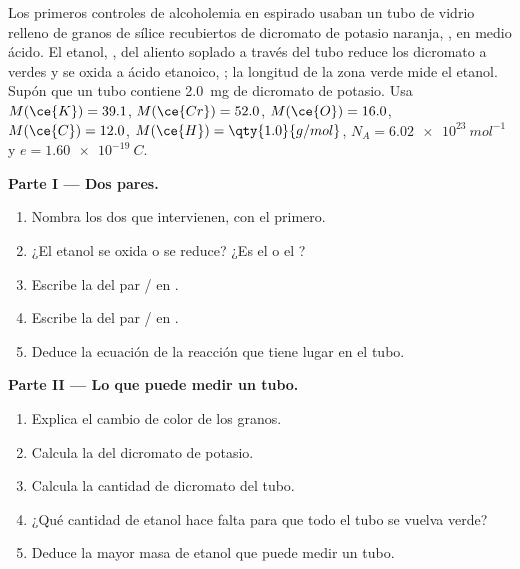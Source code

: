 \begin{problem}
\label{pb:g11:redox:1}
Los primeros controles de alcoholemia en  espirado usaban un tubo de
vidrio relleno de granos de sílice recubiertos de dicromato de potasio
naranja, , en medio ácido. El etanol, , del
aliento soplado a través del tubo reduce los  dicromato a 
 verdes y se oxida a ácido etanoico, ; la
longitud de la zona verde mide el etanol. Supón que un tubo contiene
\qty{2.0}{mg} de dicromato de potasio. Usa
$M(\ce{K}) = 39.1$, $M(\ce{Cr}) = 52.0$, $M(\ce{O}) = 16.0$,
$M(\ce{C}) = 12.0$, $M(\ce{H}) = \qty{1.0}{g/mol}$, $N_A =
\qty{6.02e23}{mol^{-1}}$ y $e = \qty{1.60e-19}{C}$.

\medskip
\noindent\textbf{Parte I --- Dos pares.}
\begin{enumerate}
  \item Nombra los dos  que intervienen, con el 
        primero.
  \item ¿El etanol se oxida o se reduce? ¿Es el  o el ?
  \item Escribe la  del par / en
        .
  \item Escribe la  del par / en
        .
  \item Deduce la ecuación de la reacción que tiene lugar en el tubo.
\end{enumerate}

\medskip
\noindent\textbf{Parte II --- Lo que puede medir un tubo.}
\begin{enumerate}[resume]
  \item Explica el cambio de color de los granos.
  \item Calcula la  del dicromato de potasio.
  \item Calcula la cantidad de  dicromato del tubo.
  \item ¿Qué cantidad de etanol hace falta para que todo el tubo se
        vuelva verde?
  \item Deduce la mayor masa de etanol que puede medir un tubo.
\end{enumerate}


\end{problem}
